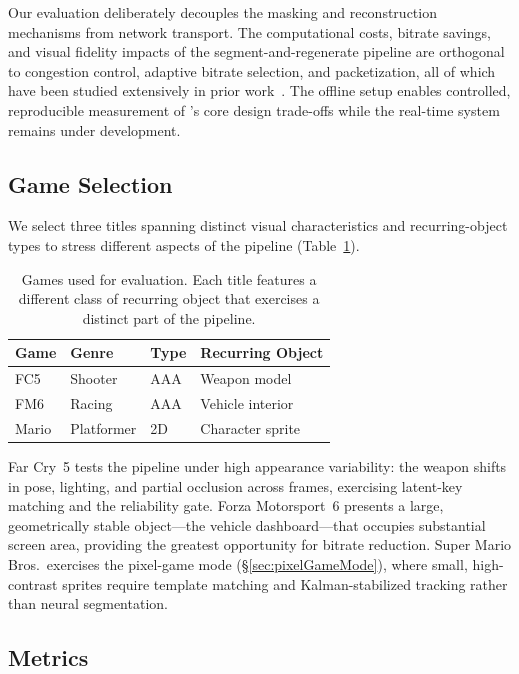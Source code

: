 Our evaluation deliberately decouples the masking and reconstruction mechanisms from network transport.
The computational costs, bitrate savings, and visual fidelity impacts of the segment-and-regenerate pipeline are orthogonal to congestion control, adaptive bitrate selection, and packetization, all of which have been studied extensively in prior work~\cite{}.
The offline setup enables controlled, reproducible measurement of \sysname's core design trade-offs while the real-time system remains under development.

\subsection{Game Selection}
\label{sec:gameSelection}

We select three titles spanning distinct visual characteristics and recurring-object types to stress different aspects of the pipeline (Table~\ref{tab:Games}).

\begin{table}[t]
  \centering
  \small
  \caption{Games used for evaluation. Each title features a different class of recurring object that exercises a distinct part of the pipeline.}
  \label{tab:Games}
  \setlength{\tabcolsep}{4pt}
  \begin{tabular}{@{}llll@{}}
    \toprule
    \textbf{Game} & \textbf{Genre} & \textbf{Type} & \textbf{Recurring Object} \\
    \midrule
    FC5 & Shooter & AAA & Weapon model \\
    FM6 & Racing & AAA & Vehicle interior \\
    Mario & Platformer & 2D & Character sprite \\
    \bottomrule
  \end{tabular}
\end{table}

Far Cry~5 tests the pipeline under high appearance variability: the weapon shifts in pose, lighting, and partial occlusion across frames, exercising latent-key matching and the reliability gate.
Forza Motorsport~6 presents a large, geometrically stable object---the vehicle dashboard---that occupies substantial screen area, providing the greatest opportunity for bitrate reduction.
Super Mario Bros.\ exercises the pixel-game mode (\S\ref{sec:pixelGameMode}), where small, high-contrast sprites require template matching and Kalman-stabilized tracking rather than neural segmentation.

\subsection{Metrics}
\label{sec:metrics}

